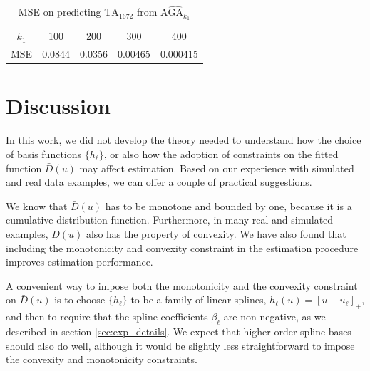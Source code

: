 \documentclass[twoside,11pt]{article}
\begin{document}
\begin{table}
\centering
\begin{tabular}{c||c|c|c|c}
$k_1$ & 100 & 200 & 300 & 400 \\
MSE & 0.0844 & 0.0356 & 0.00465 & 0.000415
\end{tabular}
\caption{MSE on predicting $\text{TA}_{1672}$ from $\widehat{\text{AGA}_{k_1}}$}\label{tab:lfw_accuracy}
\end{table}

\section{Discussion}

In this work, we did not develop the theory needed to understand how the choice of basis functions $\{h_\ell\}$, or also how the adoption of constraints on the fitted function $\bar{D}(u)$ may affect estimation.
Based on our experience with simulated and real data examples, we can offer a couple of practical suggestions.

We know that $\bar{D}(u)$ has to be monotone and bounded by one, because it is a cumulative distribution function.  Furthermore, in many real and simulated examples, $\bar{D}(u)$ also has the property of convexity.
We have also found that including the
monotonicity and convexity constraint in the estimation procedure improves estimation performance.

A convenient way to impose both the monotonicity and the convexity constraint on $\bar{D}(u)$ is to choose $\{h_\ell\}$ to be a family of linear splines, $h_\ell(u) = [u - u_\ell]_+$, and then to require that the spline coefficients $\beta_\ell$ are non-negative, as we described in section \ref{sec:exp_details}.
We expect that higher-order spline bases should also do well, although it would be slightly less straightforward to impose the convexity and monotonicity constraints.
\end{document}
